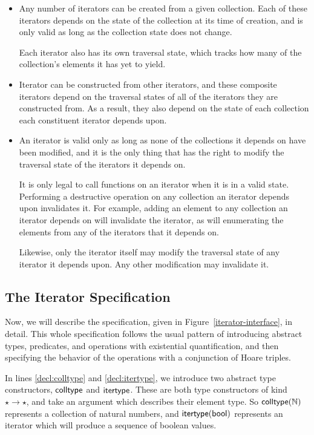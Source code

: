 \begin{itemize}
\item Any number of iterators can be created from a given collection.
  Each of these iterators depends on the state of the collection at
  its time of creation, and is only valid as long as the collection
  state does not change.

  Each iterator also has its own traversal state, which tracks how 
  many of the collection's elements it has yet to yield. 

\item Iterator can be constructed from other iterators, and these
  composite iterators depend on the traversal states of all of the
  iterators they are constructed from. As a result, they also depend
  on the state of each collection each constituent iterator depends
  upon. 

\item An iterator is valid only as long as none of the collections it
  depends on have been modified, and it is the only thing that has the
  right to modify the traversal state of the iterators it depends on.

  It is only legal to call functions on an iterator when it is in a
  valid state. Performing a destructive operation on any collection an
  iterator depends upon invalidates it. For example, adding an element
  to any collection an iterator depends on will invalidate the
  iterator, as will enumerating the elements from any of the iterators
  that it depends on.

  Likewise, only the iterator itself may modify the traversal state of
  any iterator it depends upon. Any other modification may invalidate
  it.
\end{itemize}

\subsection{The Iterator Specification}

Now, we will describe the specification, given in
Figure~\ref{iterator-interface}, in detail. This whole specification
follows the usual pattern of introducing abstract types, predicates,
and operations with existential quantification, and then specifying
the behavior of the operations with a conjunction of Hoare triples.

In lines \ref{decl:colltype} and \ref{decl:itertype}, we introduce two
abstract type constructors, $\mathsf{colltype}$ and $\mathsf{itertype}$. These are
both type constructors of kind $\star \to \star$, and take an argument
which describes their element type. So $\mathsf{colltype}(\mathbb{N})$ represents a
collection of natural numbers, and $\mathsf{itertype}(\mathsf{bool})$ represents an
iterator which will produce a sequence of boolean values.

